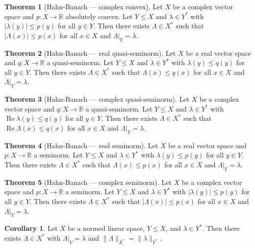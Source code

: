 \documentclass[12pt]{article}
\theoremstyle{definition}
\newtheorem{theorem}{Theorem}
\newtheorem{corollary}{Corollary}
\newcommand{\R}{\mathbb{R}}
\newcommand{\<}{\left\langle}
\renewcommand{\>}{\right\rangle}
\renewcommand{\Re}{\operatorname{Re}}
\begin{document}
\begin{theorem}[Hahn-Banach --- complex convex]
    Let $X$ be a complex vector space and $p : X \to \R$ absolutely convex.
    Let $Y \leq X$ and $\lambda \in Y^*$ with $|\lambda(y)| \leq p(y)$ for all $y \in Y$.
    Then there exists $\Lambda \in X^*$ such that $|\Lambda(x)| \leq p(x)$ for all $x \in X$ and $\Lambda|_Y = \lambda$.
\end{theorem}

\begin{theorem}[Hahn-Banach --- real quasi-seminorm]
    Let $X$ be a real vector space and $q : X \to \R$ a quasi-seminorm.
    Let $Y \leq X$ and $\lambda \in Y^*$ with $\lambda(y) \leq q(y)$ for all $y \in Y$.
    Then there exists $\Lambda \in X^*$ such that $\Lambda(x) \leq q(x)$ for all $x \in X$ and $\Lambda|_Y = \lambda$.
\end{theorem}

\begin{theorem}[Hahn-Banach --- complex quasi-seminorm]
    Let $X$ be a complex vector space and $q : X \to \R$ a quasi-seminorm.
    Let $Y \leq X$ and $\lambda \in Y^*$ with $\Re\lambda(y) \leq q(y)$ for all $y \in Y$.
    Then there exists $\Lambda \in X^*$ such that $\Re\Lambda(x) \leq q(x)$ for all $x \in X$ and $\Lambda|_Y = \lambda$.
\end{theorem}

\begin{theorem}[Hahn-Banach --- real seminorm]
    Let $X$ be a real vector space and $p : X \to \R$ a seminorm.
    Let $Y \leq X$ and $\lambda \in Y^*$ with $\lambda(y) \leq p(y)$ for all $y \in Y$.
    Then there exists $\Lambda \in X^*$ such that $\Lambda(x) \leq p(x)$ for all $x \in X$ and $\Lambda|_Y = \lambda$.
\end{theorem}

\begin{theorem}[Hahn-Banach --- complex seminorm]
    Let $X$ be a complex vector space and $p : X \to \R$ a seminorm.
    Let $Y \leq X$ and $\lambda \in Y^*$ with $|\lambda(y)| \leq p(y)$ for all $y \in Y$.
    Then there exists $\Lambda \in X^*$ such that $|\Lambda(x)| \leq p(x)$ for all $x \in X$ and $\Lambda|_Y = \lambda$.
\end{theorem}

\begin{corollary}
    Let $X$ be a normed linear space, $Y \leq X$, and $\lambda \in Y^*$.
    Then there exists $\Lambda \in X^*$ with $\Lambda|_Y = \lambda$ and $\|\Lambda\|_{X^*} = \|\lambda\|_{Y^*}$.
\end{corollary}
\end{document}
